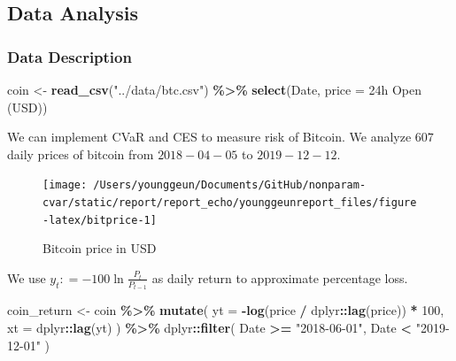\documentclass[
]{article}
\newenvironment{Shaded}{\begin{snugshade}}{\end{snugshade}}
\newcommand{\DataTypeTok}[1]{\textcolor[rgb]{0.13,0.29,0.53}{#1}}
\newcommand{\DecValTok}[1]{\textcolor[rgb]{0.00,0.00,0.81}{#1}}
\newcommand{\KeywordTok}[1]{\textcolor[rgb]{0.13,0.29,0.53}{\textbf{#1}}}
\newcommand{\NormalTok}[1]{#1}
\newcommand{\OperatorTok}[1]{\textcolor[rgb]{0.81,0.36,0.00}{\textbf{#1}}}
\newcommand{\StringTok}[1]{\textcolor[rgb]{0.31,0.60,0.02}{#1}}
\theoremstyle{definition}
\theoremstyle{definition}
\theoremstyle{definition}
\theoremstyle{remark}
\begin{document}
\hypertarget{data-analysis}{%
\subsection{Data Analysis}\label{data-analysis}}

\hypertarget{data-description}{%
\subsubsection{Data Description}\label{data-description}}

\begin{Shaded}
\begin{Highlighting}[]
\NormalTok{coin <{-}}
\StringTok{  }\KeywordTok{read\_csv}\NormalTok{(}\StringTok{"../data/btc.csv"}\NormalTok{) }\OperatorTok{\%>\%}
\StringTok{  }\KeywordTok{select}\NormalTok{(Date, }\DataTypeTok{price =} \StringTok{\textasciigrave{}}\DataTypeTok{24h Open (USD)}\StringTok{\textasciigrave{}}\NormalTok{)}
\end{Highlighting}
\end{Shaded}

We can implement CVaR and CES to measure risk of Bitcoin. We analyze \(607\) daily prices of bitcoin from \(2018-04-05\) to \(2019-12-12\).

\begin{figure}[H]

{\centering \texttt{[image: /Users/younggeun/Documents/GitHub/nonparam-cvar/static/report/report\_echo/younggeunreport\_files/figure-latex/bitprice-1]} 

}

\caption{Bitcoin price in USD}\label{fig:bitprice}
\end{figure}

We use \(y_t \mathpunct{:}=- 100 \ln \frac{P_t}{P_{t - 1}}\) as daily return to approximate percentage loss.

\begin{Shaded}
\begin{Highlighting}[]
\NormalTok{coin\_return <{-}}\StringTok{ }
\StringTok{  }\NormalTok{coin }\OperatorTok{\%>\%}\StringTok{ }
\StringTok{  }\KeywordTok{mutate}\NormalTok{(}
    \DataTypeTok{yt =} \OperatorTok{{-}}\KeywordTok{log}\NormalTok{(price }\OperatorTok{/}\StringTok{ }\NormalTok{dplyr}\OperatorTok{::}\KeywordTok{lag}\NormalTok{(price)) }\OperatorTok{*}\StringTok{ }\DecValTok{100}\NormalTok{,}
    \DataTypeTok{xt =}\NormalTok{ dplyr}\OperatorTok{::}\KeywordTok{lag}\NormalTok{(yt)}
\NormalTok{  ) }\OperatorTok{\%>\%}\StringTok{ }
\StringTok{  }\NormalTok{dplyr}\OperatorTok{::}\KeywordTok{filter}\NormalTok{(}
\NormalTok{    Date }\OperatorTok{>=}\StringTok{ "2018{-}06{-}01"}\NormalTok{,}
\NormalTok{    Date }\OperatorTok{<}\StringTok{ "2019{-}12{-}01"}
\NormalTok{  )}
\end{Highlighting}
\end{Shaded}
\end{document}
